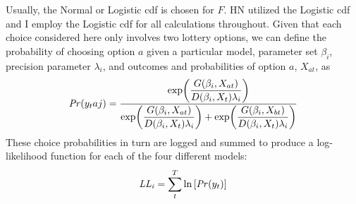 \documentclass[../main.tex]{subfiles}
\begin{document}
Usually, the Normal or Logistic cdf is chosen for $F$.
HN utilized the Logistic cdf and I employ the Logistic cdf for all calculations throughout.
Given that each choice considered here only involves two lottery options, we can define the probability of choosing option $a$ given a particular model, parameter set $\beta_i$, precision parameter $\lambda_i$, and outcomes and probabilities of option $a$, $X_{at}$, as
\begin{equation}
	\label{eq4:RE.f}
	{\ensuremath{\mathit{Pr}}}(y_taj) =\dfrac{\exp\!\left( \dfrac{ G(\beta_i,X_{at}) }{ D(\beta_i,X_{t})\lambda_i }  \right)}{  \exp\!\left( \dfrac{ G(\beta_i,X_{at}) }{ D(\beta_i,X_{t})\lambda_i }  \right) + \exp\!\left( \dfrac{ G(\beta_i,X_{bt}) }{ D(\beta_i,X_{t})\lambda_i }  \right)    }
\end{equation}
\noindent These choice probabilities in turn are logged and summed to produce a log-likelihood function for each of the four different models:
\begin{equation}
	\label{eq4:ll}
	\mathit{LL_i} = \sum_{t}^T \ln \left[ {\mathit{Pr}}(y_t) \right]
\end{equation}
\end{document}
